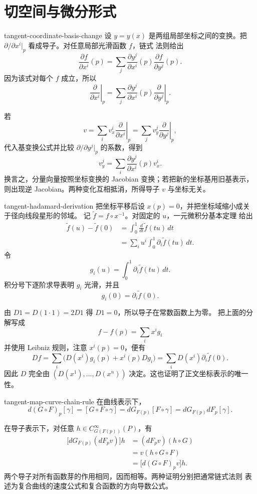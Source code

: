 \chapter{切空间与微分形式}
\label{chap:tangent-differential-forms-solutions}

\begin{solution}{tangent-coordinate-basis-change}
设 \(y=y(x)\) 是两组局部坐标之间的变换。把
\(\partial/\partial x^i|_p\) 看成导子。对任意局部光滑函数 \(f\)，链式
法则给出
\[
 \frac{\partial f}{\partial x^i}(p)
 =\sum_j\frac{\partial y^j}{\partial x^i}(p)
       \frac{\partial f}{\partial y^j}(p).
\]
因为该式对每个 \(f\) 成立，所以
\[
 \left.\frac{\partial}{\partial x^i}\right|_p
 =\sum_j\frac{\partial y^j}{\partial x^i}(p)
       \left.\frac{\partial}{\partial y^j}\right|_p.
\]

若
\[
 v=\sum_i v_x^i\left.\frac{\partial}{\partial x^i}\right|_p
  =\sum_j v_y^j\left.\frac{\partial}{\partial y^j}\right|_p,
\]
代入基变换公式并比较 \(\partial/\partial y^j|_p\) 的系数，得到
\[
 v_y^j
 =\sum_i\frac{\partial y^j}{\partial x^i}(p)v_x^i.
\]
换言之，分量向量按照坐标变换的 Jacobian 变换；若把新的坐标基用旧基表示，
则出现逆 Jacobian。两种变化互相抵消，所得导子 \(v\) 与坐标无关。
\end{solution}

\begin{solution}{tangent-hadamard-derivation}
把坐标平移后设 \(x(p)=0\)，并把坐标域缩小成关于径向线段星形的邻域。
记 \(\widetilde f=f\circ x^{-1}\)。对固定的 \(u\)，一元微积分基本定理
给出
\begin{align*}
 \widetilde f(u)-\widetilde f(0)
 &=\int_0^1\frac{d}{dt}\widetilde f(tu)\,dt\\
 &=\sum_i u^i\int_0^1\partial_i\widetilde f(tu)\,dt.
\end{align*}
令
\[
 g_i(u)=\int_0^1\partial_i\widetilde f(tu)\,dt.
\]
积分号下逐阶求导表明 \(g_i\) 光滑，并且
\[
 g_i(0)=\partial_i\widetilde f(0).
\]

由 \(D1=D(1\cdot1)=2D1\) 得 \(D1=0\)，所以导子在常数函数上为零。
把上面的分解写成
\[
 f-f(p)=\sum_i x^i g_i
\]
并使用 Leibniz 规则，注意 \(x^i(p)=0\)，便有
\[
 Df
 =\sum_i\bigl(D(x^i)g_i(p)+x^i(p)Dg_i\bigr)
 =\sum_iD(x^i)\partial_i\widetilde f(0).
\]
因此 \(D\) 完全由
\((D(x^1),\ldots,D(x^n))\) 决定。这也证明了正文坐标表示的唯一性。
\end{solution}

\begin{solution}{tangent-map-curve-chain-rule}
在曲线表示下，
\[
 d(G\circ F)_p[\gamma]
 =[G\circ F\circ\gamma]
 =dG_{F(p)}[F\circ\gamma]
 =dG_{F(p)}dF_p[\gamma].
\]

在导子表示下，对任意 \(h\in C^\infty_{G(F(p))}(P)\)，有
\begin{align*}
 \bigl[dG_{F(p)}(dF_pv)\bigr]h
 &=(dF_pv)(h\circ G)\\
 &=v(h\circ G\circ F)\\
 &=\bigl[d(G\circ F)_pv\bigr]h.
\end{align*}
两个导子对所有函数芽的作用相同，因而相等。两种证明分别把通常链式法则
表述为复合曲线的速度公式和复合函数的方向导数公式。
\end{solution}

